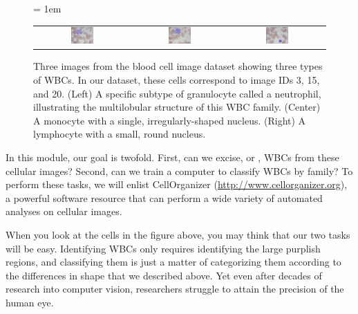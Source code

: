 \begin{figure}[h]
\centering
\tabcolsep = 1em
\mySfFamily
\begin{tabular}{c c c}
\includegraphics[width = 0.25\textwidth]{../images/neutrophil.png} & \includegraphics[width = 0.25\textwidth]{../images/monocyte.png} & \includegraphics[width = 0.25\textwidth]{../images/lymphocyte.png}
\end{tabular}
\caption{Three images from the blood cell image dataset showing three types of WBCs. In our dataset, these cells correspond to image IDs 3, 15, and 20. (Left) A specific subtype of granulocyte called a neutrophil, illustrating the multilobular structure of this WBC family. (Center) A monocyte with a single, irregularly-shaped nucleus. (Right) A lymphocyte with a small, round nucleus.}
\label{fig:three_families}
\end{figure}

In this module, our goal is twofold. First, can we excise, or , WBCs from these cellular images? Second, can we train a computer to classify WBCs by family? To perform these tasks, we will enlist CellOrganizer (\url{http://www.cellorganizer.org}), a powerful software resource that can perform a wide variety of automated analyses on cellular images.

When you look at the cells in the figure above, you may think that our two tasks will be easy. Identifying WBCs only requires identifying the large purplish regions, and classifying them is just a matter of categorizing them according to the differences in shape that we described above. Yet even after decades of research into computer vision, researchers struggle to attain the precision of the human eye.

